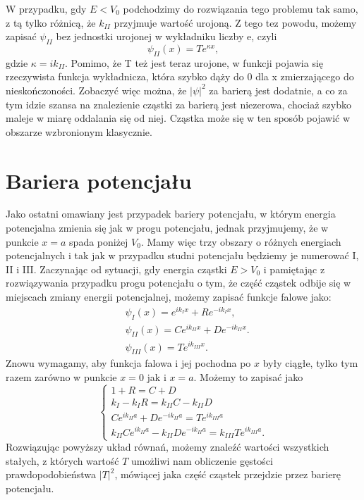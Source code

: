 \documentclass{SGGW-thesis}
\begin{document}
W przypadku, gdy $E < V_0$ podchodzimy do rozwiązania tego problemu tak samo, z tą tylko różnicą, że $k_{II}$ przyjmuje wartość urojoną. Z tego tez powodu, możemy zapisać $\psi_{II}$ bez jednostki urojonej w wykładniku liczby e, czyli
	\begin{equation}
	\psi_{II}(x) = Te^{\kappa x},
	\end{equation}
gdzie $\kappa=ik_{II}$. Pomimo, że T też jest teraz urojone, w funkcji pojawia się rzeczywista funkcja wykładnicza, która szybko dąży do 0 dla x zmierzającego do nieskończoności. Zobaczyć więc można, że $|\psi|^2$ za barierą jest dodatnie, a co za tym idzie szansa na znalezienie cząstki za barierą jest niezerowa, chociaż szybko maleje w miarę oddalania się od niej. Cząstka może się w ten sposób pojawić w obszarze wzbronionym klasycznie.

	\section{Bariera potencjału}
	Jako ostatni omawiany jest przypadek bariery potencjału, w którym energia potencjalna zmienia się jak w progu potencjału, jednak przyjmujemy, że w punkcie $x=a$ spada poniżej $V_0$. Mamy więc trzy obszary o różnych energiach potencjalnych i tak jak w przypadku studni potencjału będziemy je numerować I, II i III. Zaczynając od sytuacji, gdy energia cząstki $E>V_0$ i pamiętając z rozwiązywania przypadku progu potencjału o tym, że część cząstek odbije się w miejscach zmiany energii potencjalnej, możemy zapisać funkcje falowe jako:
	\begin{equation}
	\begin{split}
		&\psi_I(x) = e^{ik_Ix} + Re^{-ik_Ix}, \\
		&\psi_{II}(x) = Ce^{ik_{II}x} + De^{-ik_{II}x}. \\
		&\psi_{III}(x) = Te^{ik_{III}x}.
	\end{split}
	\end{equation}
Znowu wymagamy, aby funkcja falowa i jej pochodna po $x$ były ciągłe, tylko tym razem zarówno w punkcie $x=0$ jak i $x=a$. Możemy to zapisać jako
	\begin{equation}\label{eqn:barrier-system}
	\begin{cases}
		1 + R = C + D \\
		k_I - k_IR = k_{II}C - k_{II}D \\
		Ce^{ik_{II}a} + De^{-ik_{II}a} = Te^{ik_{III}a} \\
		k_{II}Ce^{ik_{II}a} - k_{II}De^{-ik_{II}a} = k_{III}Te^{ik_{III}a}.
	\end{cases}
	\end{equation}
Rozwiązując powyższy układ równań, możemy znaleźć wartości wszystkich stałych, z których wartość $T$ umożliwi nam obliczenie gęstości prawdopodobieństwa $|T|^2$, mówiącej jaka część cząstek przejdzie przez barierę potencjału. 
\end{document}
